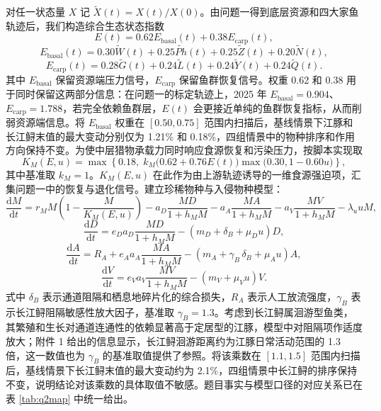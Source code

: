 \documentclass{MMCStyle}
\begin{document}
对任一状态量 $X$ 记 $\widetilde X(t)=X(t)/X(0)$。由问题一得到底层资源和四大家鱼轨迹后，我们构造综合生态状态指数
\begin{equation}
E(t)=0.62E_{\text{basal}}(t)+0.38E_{\text{carp}}(t),
\end{equation}
\begin{equation}
E_{\text{basal}}(t)=0.30\widetilde W(t)+0.25\widetilde{Ph}(t)+0.25\widetilde Z(t)+0.20\widetilde N(t),
\end{equation}
\begin{equation}
E_{\text{carp}}(t)=0.28\widetilde G(t)+0.24\widetilde L(t)+0.24\widetilde Y(t)+0.24\widetilde Q(t).
\end{equation}
其中 $E_{\text{basal}}$ 保留资源端压力信号，$E_{\text{carp}}$ 保留鱼群恢复信号。权重 0.62 和 0.38 用于同时保留这两部分信息：在问题一的标定轨迹上，2025 年 $E_{\text{basal}}=0.904$、$E_{\text{carp}}=1.788$，若完全依赖鱼群层，$E(t)$ 会更接近单纯的鱼群恢复指标，从而削弱资源端信息。将 $E_{\text{basal}}$ 权重在 $[0.50,0.75]$ 范围内扫描后，基线情景下江豚和长江鲟末值的最大变动分别仅为 1.21\% 和 0.18\%，四组情景中的物种排序和作用方向保持不变。为使中层猎物承载力同时响应食源恢复和污染压力，按脚本实现取
\begin{equation}
K_M(E,u)=\max\left\{0.18,\;k_M\bigl(0.62+0.76E(t)\bigr)\max\bigl(0.30,1-0.60u\bigr)\right\},
\end{equation}
其中基准取 $k_M=1$。$K_M(E,u)$ 在此作为由上游轨迹诱导的一维食源强迫项，汇集问题一中的恢复与退化信号。建立珍稀物种与入侵物种模型\cite{holling1959}：
\begin{equation}
\frac{\mathrm{d}M}{\mathrm{d}t}
=r_M M\left(1-\frac{M}{K_M(E,u)}\right)
-a_D\frac{MD}{1+h_MM}
-a_A\frac{MA}{1+h_MM}
-a_V\frac{MV}{1+h_MM}
-\lambda_u uM,
\end{equation}
\begin{equation}
\frac{\mathrm{d}D}{\mathrm{d}t}
=e_D a_D\frac{MD}{1+h_MM}-(m_D+\delta_B+\mu_Du)D,
\end{equation}
\begin{equation}
\frac{\mathrm{d}A}{\mathrm{d}t}
=R_A+e_A a_A\frac{MA}{1+h_MM}-(m_A+\gamma_B\,\delta_B+\mu_Au)A,
\end{equation}
\begin{equation}
\frac{\mathrm{d}V}{\mathrm{d}t}
=e_V a_V\frac{MV}{1+h_MM}-(m_V+\mu_Vu)V.
\end{equation}
式中 $\delta_B$ 表示通道阻隔和栖息地碎片化的综合损失，$R_A$ 表示人工放流强度，$\gamma_B$ 表示长江鲟阻隔敏感性放大因子，基准取 $\gamma_B=1.3$。考虑到长江鲟属洄游型鱼类，其繁殖和生长对通道连通性的依赖显著高于定居型的江豚，模型中对阻隔项作适度放大；附件 1 给出的信息显示，长江鲟洄游距离约为江豚日常活动范围的 1.3 倍，这一数值也为 $\gamma_B$ 的基准取值提供了参照。将该乘数在 $[1.1,1.5]$ 范围内扫描后，基线情景下长江鲟末值的最大变动约为 2.1\%，四组情景中长江鲟的排序保持不变，说明结论对该乘数的具体取值不敏感。题目事实与模型口径的对应关系已在表 \ref{tab:q2map} 中统一给出。
\end{document}
